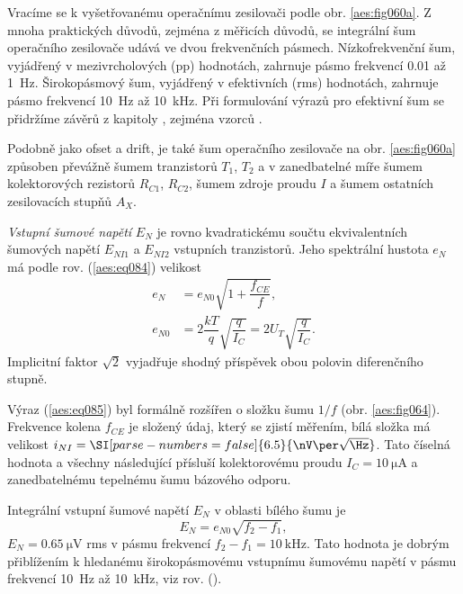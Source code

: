         Vracíme se k vyšetřovanému operačnímu zesilovači podle obr. \ref {aes:fig060a}. Z mnoha
        praktických důvodů, zejména z měřicích důvodů, se integrální šum operačního zesilovače udává
        ve dvou frekvenčních pásmech. Nízkofrekvenční šum, vyjádřený v mezivrcholových (pp)
        hodnotách, zahrnuje pásmo frekvencí \num{0.01} až \qty{1}{\Hz}. Širokopásmový šum, vyjádřený
        v efektivních (rms) hodnotách, zahrnuje pásmo frekvencí \qty{10}{\Hz} až \qty{10}{\kHz}. Při
        formulování výrazů pro efektivní šum se přidržíme závěrů z kapitoly ,
        zejména vzorců .
        
        Podobně jako ofset a drift, je také šum operačního zesilovače na obr. \ref {aes:fig060a}
        způsoben převážně šumem tranzistorů \(T_1\), \(T_2\) a v zanedbatelné míře šumem
        kolektorových rezistorů \(R_{C1}\), \(R_{C2}\), šumem zdroje proudu \(I\) a šumem ostatních
        zesilovacích stupňů \(A_X\).

        \emph{Vstupní šumové napětí} \(E_N\) je rovno kvadratickému součtu ekvivalentních šumových
        napětí \(E_{NI1}\) a \(E_{NI2}\) vstupních tranzistorů. Jeho spektrální hustota \(e_N\) má
        podle rov. (\ref {aes:eq084}) velikost
        \begin{equation}\label{aes:eq085} 
          \begin{split}
            e_N    &= e_{N0}\sqrt{1 + \dfrac{f_{CE}}{f}},                             \\
            e_{N0} &= 2\dfrac{kT}{q}\sqrt{\dfrac{q}{I_C}} = 2U_T\sqrt{\dfrac{q}{I_C}}.
          \end{split}
        \end{equation}
        Implicitní faktor \(\sqrt{2}\) vyjadřuje shodný příspěvek obou polovin diferenčního stupně.

        Výraz (\ref {aes:eq085}) byl formálně rozšířen o složku šumu \(1/f\) (obr.
        \ref{aes:fig064}). Frekvence kolena \(f_{CE}\) je složený údaj, který se zjistí měřením,
        bílá složka má velikost \(i_{NI} = \SI[parse-numbers = false]{6.5}{\nV\per\sqrt{\Hz}}\).
        Tato číselná hodnota a všechny následující přísluší kolektorovému proudu \(I_C =
        \qty{10}{\uA}\) a zanedbatelnému tepelnému šumu bázového odporu.

        Integrální vstupní šumové napětí \(E_N\) v oblasti bílého šumu je
        \begin{equation}\label{aes:eq086}
          E_N = e_{N0}\sqrt{f_2 - f_1},
        \end{equation}
        \(E_N = \qty{0.65}{\uV}\) rms v pásmu frekvencí \(f_2 - f_1 = \qty{10}{\kHz}\). Tato hodnota
        je dobrým  přiblížením k hledanému širokopásmovému vstupnímu šumovému napětí v pásmu
        frekvencí \qty{10}{\Hz} až \qty{10}{\kHz}, viz rov. ().

